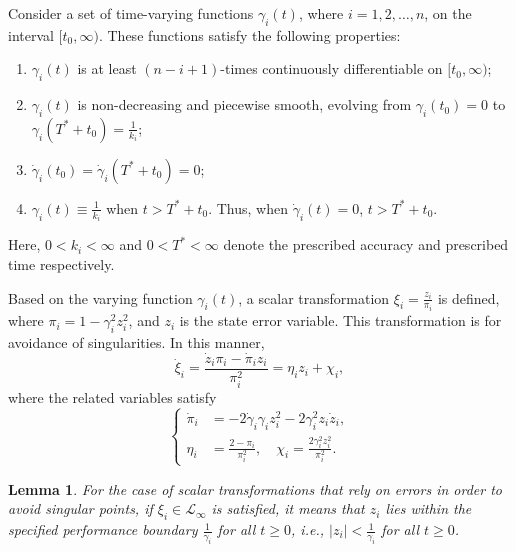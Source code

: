 \documentclass[]{interact}
\theoremstyle{plain}%
\newtheorem{lemma}{Lemma}
\theoremstyle{definition}
\theoremstyle{remark}
\begin{document}
Consider a set of time-varying functions \( \gamma_i(t) \), where \( i = 1, 2, \dots, n \), on the interval \( [t_0, \infty) \). These functions satisfy the following properties:
\begin{enumerate}
    \item\( \gamma_i(t) \) is at least  \( (n - i + 1) \)-times continuously differentiable on \( [t_0, \infty) \);
    \item \( \gamma_i(t) \) is non-decreasing and piecewise smooth, evolving from \( \gamma_i(t_0) = 0 \) to \( \gamma_i(T^* + t_0) = \frac{1}{k_i} \);
    \item \( \dot{\gamma}_i(t_0) = \dot{\gamma}_i(T^* + t_0) = 0 \);
   \item\( \gamma_i(t) \equiv \frac{1}{k_i} \) when \( t > T^* + t_0 \). Thus, when \( \dot{\gamma}_i(t) = 0 \), \( t > T^* + t_0 \).
\end{enumerate}
Here, \( 0 < k_i < \infty \) and \( 0 < T^* < \infty \) denote the prescribed accuracy and prescribed time respectively.

Based on the varying function \( \gamma_i(t) \), a scalar transformation $\xi_i=\frac{z_i}{\pi_i}$ is defined,  
where \( \pi_i = 1 - \gamma_i^2 z_i^2 \), and \( z_i \) is the state error variable.
This transformation is for avoidance of singularities.  
In this manner,  
\begin{equation}
\label{eq:22}
\dot{\xi}_i = \frac{\dot{z}_i \pi_i - \dot{\pi}_i z_i}{\pi_i^2} = \eta_i z_i + \chi_i,
\end{equation}
where the related variables satisfy
\begin{equation}
\left\{
\begin{aligned}
\dot{\pi}_i &= -2\dot{\gamma}_i \gamma_i z_i^2 - 2 \gamma_i^2 z_i \dot{z}_i ,\\
\eta_i &= \frac{2 - \pi_i}{\pi_i^2}, \quad 
\chi_i = \frac{2 \gamma_i^2 z_i^2}{\pi_i^2}.
\end{aligned}
\right.
\label{eq:23}
\end{equation}

\begin{lemma}
\label{lemma:lemma_stability}
For the case of scalar transformations that rely on errors in order to avoid singular points, if \(\xi_i \in \mathcal{L}_\infty\) is satisfied, it means that \(z_i\) lies within the specified performance boundary \(\frac{1}{\gamma_i}\) for all \(t \geq 0\), i.e., \(|z_i| < \frac{1}{\gamma_i}\) for all \(t \geq 0\).
\end{lemma}
\end{document}
